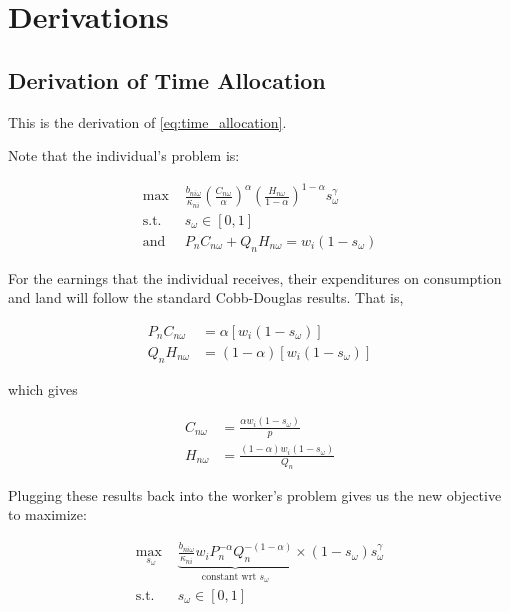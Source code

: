 \documentclass[10pt]{article}
\begin{document}
\section{Derivations}

\subsection{Derivation of Time Allocation}
\label{sec:time_allocation}

This is the derivation of \eqref{eq:time_allocation}.

Note that the individual's problem is:

\begin{align}
    \text{max } &\frac{b_{n i \omega}}{\kappa_{n i}}\left(\frac{C_{n \omega}}{\alpha}\right)^\alpha\left(\frac{H_{n \omega}}{1-\alpha}\right)^{1-\alpha} s_\omega^\gamma \\
    \text{s.t. } &s_\omega \in [0,1] \\
    \text{and } & P_n C_{n \omega}+Q_n H_{n \omega}=w_i\left(1-s_\omega\right)
\end{align}

For the earnings that the individual receives, their expenditures 
on consumption and land will follow the standard Cobb-Douglas 
results. That is,

\begin{align}
    P_n C_{n \omega}&=\alpha\left[w_i\left(1-s_\omega\right)\right] \\
    Q_n H_{n \omega}&=(1-\alpha)\left[w_i\left(1-s_\omega\right)\right]
\end{align}

which gives 

\begin{align}
    C_{n \omega}&=\frac{\alpha w_i\left(1-s_\omega\right)}{p} \\
    H_{n \omega}&=\frac{(1-\alpha) w_i\left(1-s_\omega\right)}{Q_n}
\end{align}

Plugging these results back into the worker's problem gives us
the new objective to maximize:

\begin{align}
    \underset{s_\omega}{\text{max }} &\underbrace{\frac{b_{n i \omega}}{\kappa_{n i}} w_i P_n^{-\alpha} Q_n^{-(1-\alpha)}}_{\text {constant wrt } s_\omega} \times\left(1-s_\omega\right) s_\omega^\gamma \\
    \text{s.t. } &s_\omega \in [0,1]
\end{align}
\end{document}
